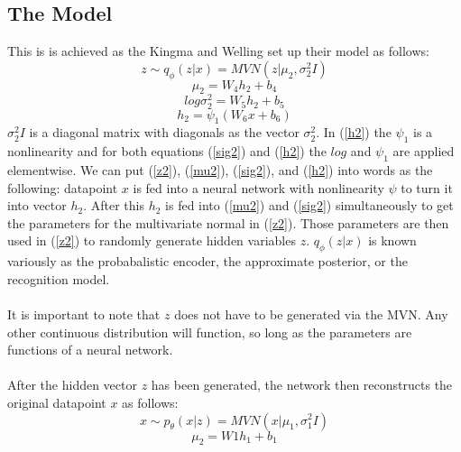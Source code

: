 \documentclass[10pt]{article}
\begin{document}
\subsection {The Model}
This is is achieved as the Kingma and Welling set up their model as follows:
\begin{equation}\label{z2}
z \sim q_{\phi}({z}| {x}) = MVN({z}|{\mu}_2, {\sigma}^2_2I)
\end{equation}
\begin{equation}\label{mu2}
\mu_2 = W_4h_2 +b_4
\end{equation}
\begin{equation}\label{sig2}
log\sigma^2_2 = W_5h_2 + b_5   
\end{equation}
\begin{equation}\label{h2}
h_2 = \psi_{1}(W_6x+b_6)
\end{equation}
$\sigma^2_2I$ is a diagonal matrix with diagonals as the vector $\sigma^2_2$.
In (\ref{h2}) the $\psi_{1}$ is a nonlinearity and for both equations (\ref{sig2}) and 
(\ref{h2}) the $log$ and $\psi_{1}$ are applied elementwise. We can put (\ref{z2}),
(\ref{mu2}), (\ref{sig2}), and (\ref{h2}) into words as the following: datapoint
$x$ is fed into a neural network with nonlinearity $\psi$ to turn it into vector $h_2$.
After this $h_2$ is fed into (\ref{mu2}) and (\ref{sig2}) simultaneously to get the parameters 
for the multivariate normal in (\ref{z2}).  Those parameters are then used in (\ref{z2}) to randomly
generate hidden variables $z$.  $q_{\phi}(z|x)$ is known variously as the probabalistic
encoder, the approximate posterior, or the recognition model. \\ \\
%
%
It is important to note that $z$ does not have to be generated via the MVN.  Any other 
continuous distribution will function, so long as the parameters are functions of a neural network. \\ \\
%
%
After the hidden vector $z$ has been generated, the network then reconstructs the original
datapoint $x$ as follows:
\begin{equation}\label{x2}
x \sim p_{\theta}(x|z) = MVN(x|{\mu}_1, {\sigma}^2_1I)
\end{equation}
\begin{equation}\label{mu1}
\mu_2 = W1h_1 +b_1
\end{equation}
\end{document}
